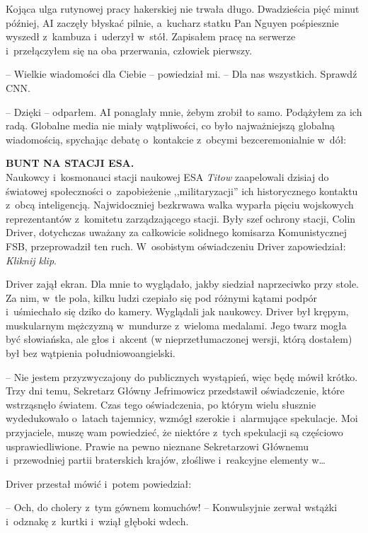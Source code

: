 \documentclass[oneside,polish,12pt,sfheadings]{mwbk}
\begin{document}
Kojąca ulga rutynowej pracy hakerskiej nie trwała długo. Dwadzieścia
pięć minut później, AI zaczęły błyskać pilnie, a~kucharz statku Pan
Nguyen pośpiesznie wyszedł z~kambuza i~uderzył w~stół. Zapisałem pracę
na serwerze i~przełączyłem się na oba przerwania, człowiek pierwszy.

-- Wielkie wiadomości dla Ciebie -- powiedział mi. -- Dla nas wszystkich.
Sprawdź CNN.

 -- Dzięki -- odparłem. AI ponaglały mnie, żebym zrobił to
samo. Podążyłem za ich radą. Globalne media nie miały wątpliwości, co
było najważniejszą globalną wiadomością, spychając debatę o~kontakcie z~obcymi bezceremonialnie w~dół:

\textbf{BUNT NA STACJI ESA.}\\
Naukowcy i~kosmonauci stacji naukowej ESA \emph{Titow} zaapelowali
dzisiaj do światowej społeczności o~zapobieżenie ,,militaryzacji'' ich
historycznego kontaktu z~obcą inteligencją. Najwidoczniej bezkrwawa
walka wyparła pięciu wojskowych reprezentantów z~komitetu zarządzającego
stacji. Były szef ochrony stacji, Colin Driver, dotychczas uważany za
całkowicie solidnego komisarza Komunistycznej FSB, przeprowadził ten
ruch. W~osobistym oświadczeniu Driver zapowiedział:\\
\emph{Kliknij klip}.

Driver zajął ekran. Dla mnie to wyglądało, jakby siedział naprzeciwko przy
stole. Za nim, w~tle pola, kilku ludzi czepiało się pod różnymi kątami
podpór i~uśmiechało się dziko do kamery. Wyglądali jak naukowcy. Driver
był krępym, muskularnym mężczyzną w~mundurze z~wieloma medalami. Jego
twarz mogła być słowiańska, ale głos i~akcent (w nieprzetłumaczonej
wersji, którą dostałem) był bez wątpienia południowoangielski.

-- Nie jestem przyzwyczajony do publicznych wystąpień, więc będę mówił
krótko. Trzy dni temu, Sekretarz Główny Jefrimowicz przedstawił
oświadczenie, które wstrząsnęło światem. Czas tego oświadczenia, po
którym wielu słusznie wydedukowało o~latach tajemnicy, wzmógł szerokie i~alarmujące spekulacje. Moi przyjaciele, muszę wam powiedzieć, że
niektóre z~tych spekulacji są częściowo usprawiedliwione. Prawie na
pewno nieznane Sekretarzowi Głównemu i~przewodniej partii braterskich
krajów, złośliwe i~reakcyjne elementy w\ldots

Driver przestał mówić i~potem powiedział: 

-- Och, do cholery z~tym gównem komuchów! -- Konwulsyjnie zerwał wstążki i~odznakę z~kurtki i~wziął
głęboki wdech.
\end{document}
